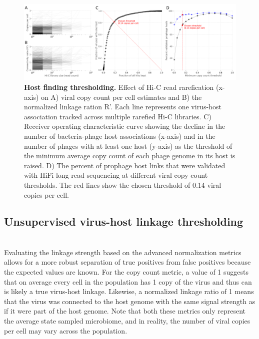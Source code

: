  \begin{figure}[!t]
    \centering
    \includegraphics[width=1\textwidth]{Figures/figure_roc_curve.png}
    \caption{\textbf{Host finding thresholding.} Effect of Hi-C read rarefication (x-axis) on A) viral copy count per cell estimates and B) the normalized linkage ration R’. Each line represents one virus-host association tracked across multiple rarefied Hi-C libraries. C) Receiver operating characteristic curve showing the decline in the number of bacteria-phage host associations (x-axis) and in the number of phages with at least one host (y-axis) as the threshold of the minimum average copy count of each phage genome in its host is raised. D) The percent of prophage host links that were validated with HiFi long-read sequencing at different viral copy count thresholds. The red lines show the chosen threshold of 0.14 viral copies per cell.}
    \label{fig:figure_roc_curve}
 \end{figure}
 
 
 
\subsection*{Unsupervised virus-host linkage thresholding} \hfill\\
    Evaluating the linkage strength based on the advanced normalization metrics allows for a more robust separation of true positives from false positives because the expected values are known. For the copy count metric, a value of 1 suggests that on average every cell in the population has 1 copy of the virus and thus can is likely a true virus-host linkage. Likewise, a normalized linkage ratio of 1 means that the virus was connected to the host genome with the same signal strength as if it were part of the host genome. Note that both these metrics only represent the average state sampled microbiome, and in reality, the number of viral copies per cell may vary across the population. 
    
